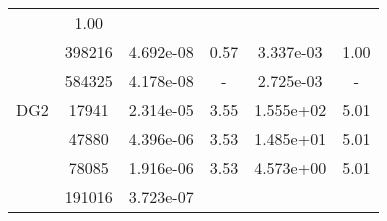 \begin{table}
\begin{center}
{\begin{tabular}{| l | c | c | c | c | c |}
                &1.00\\
                
            &398216
            
                &4.692e-08
                
                &0.57
                
                &3.337e-03
                
                &1.00\\
                
            &584325
            
                &4.178e-08
                
                &-
                
                &2.725e-03
                
                &-\\
                \hline
        \hline
        \hspace{0.1cm}DG2\hspace{0.1cm}    
        
            &17941
            
                &2.314e-05
                
                &3.55
                
                &1.555e+02
                
                &5.01\\
                
            &47880
            
                &4.396e-06
                
                &3.53
                
                &1.485e+01
                
                &5.01\\
                
            &78085
            
                &1.916e-06
                
                &3.53
                
                &4.573e+00
                
                &5.01\\
                
            &191016
            
                &3.723e-07
                

\end{tabular}}
\end{center}
\end{table}
